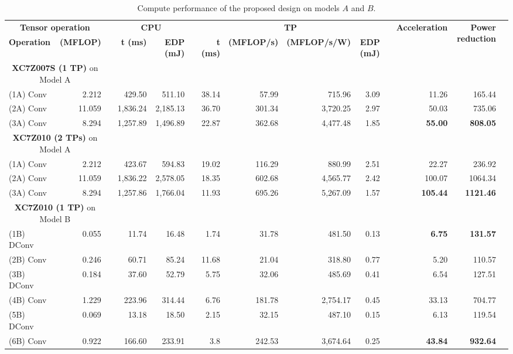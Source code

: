 \begin{table}[!t]\centering
	\caption{Compute performance of the proposed design on models $A$ and $B$.}\label{tab:perf}
	\scriptsize
	\begin{tabular}{lrrrrrrrrrrrrr}\toprule
		\multicolumn{2}{c}{\textbf{Tensor operation}} &\textbf{} &\multicolumn{2}{c}{\textbf{CPU}} &\textbf{} &\multicolumn{4}{c}{\textbf{TP}} &\textbf{} &\multirow{3}{*}{\textbf{Acceleration}} &\multirow{3}{*}{\textbf{Power reduction}} \\\cmidrule{1-2}\cmidrule{4-5}\cmidrule{7-10}
		\textbf{Operation} &\textbf{(MFLOP)} &\textbf{} &\textbf{t (ms)} &\textbf{EDP (mJ)} &\textbf{} &\textbf{t (ms)} &\textbf{(MFLOP/s)} &\textbf{(MFLOP/s/W)} &\textbf{EDP (mJ)} &\textbf{} & & \\\midrule
		\multicolumn{2}{c}{\textbf{XC7Z007S (1 TP)} on Model A} &\textbf{} &\textbf{} &\textbf{} &\textbf{} &\textbf{} & & & &\textbf{} & & \\
		(1A) Conv &2.212 & &429.50 &511.10 & &38.14 &57.99 &715.96 &3.09 & &11.26 &165.44 \\
		(2A) Conv &11.059 & &1,836.24 &2,185.13 & &36.70 &301.34 &3,720.25 &2.97 & &50.03 &735.06 \\
		(3A) Conv &8.294 & &1,257.89 &1,496.89 & &22.87 &362.68 &4,477.48 &1.85 &\textbf{} &\textbf{55.00} &\textbf{808.05} \\
		\multicolumn{2}{c}{\textbf{XC7Z010 (2 TPs)} on Model A} & & & & & & & & & & & \\
		(1A) Conv &2.212 & &423.67 &594.83 & &19.02 &116.29 &880.99 &2.51 & &22.27 &236.92 \\
		(2A) Conv &11.059 & &1,836.22 &2,578.05 & &18.35 &602.68 &4,565.77 &2.42 & &100.07 &1064.34 \\
		(3A) Conv &8.294 & &1,257.86 &1,766.04 & &11.93 &695.26 &5,267.09 &1.57 &\textbf{} &\textbf{105.44} &\textbf{1121.46} \\
		\multicolumn{2}{c}{\textbf{XC7Z010 (1 TP)} on Model B} & & & & & & & & & & & \\
		(1B) DConv &0.055 & &11.74 &16.48 & &1.74 &31.78 &481.50 &0.13 &\textbf{} &\textbf{6.75} &\textbf{131.57} \\
		(2B) Conv &0.246 & &60.71 &85.24 & &11.68 &21.04 &318.80 &0.77 & &5.20 &110.57 \\
		(3B) DConv &0.184 & &37.60 &52.79 & &5.75 &32.06 &485.69 &0.41 & &6.54 &127.51 \\
		(4B) Conv &1.229 & &223.96 &314.44 & &6.76 &181.78 &2,754.17 &0.45 & &33.13 &704.77 \\
		(5B) DConv &0.069 & &13.18 &18.50 & &2.15 &32.15 &487.10 &0.15 & &6.13 &119.54 \\
		(6B) Conv &0.922 & &166.60 &233.91 & &3.8 &242.53 &3,674.64 &0.25 &\textbf{} &\textbf{43.84} &\textbf{932.64} \\
		\bottomrule
	\end{tabular}
\end{table}

